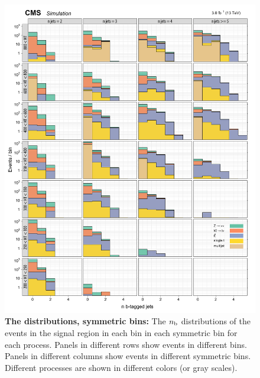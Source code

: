 \begin{figure}[!h]
\centering
\includegraphics[scale=0.95]{figures/kiplots/c150107_s150318_f015_nbjets_100}
\caption{\textbf{\boldmath The \nb distributions, symmetric \njet bins:}
The $n_{\text{b}}$ distributions of the events in the signal region in each
\scalht bin in each symmetric \njet bin for each process. Panels in
different rows show events in different \scalht bins. Panels in
different columns show events in different symmetric \njet bins.
Different processes are shown in different colors (or gray scales).}
\label{c150107_s150318_f015_nbjets_100}
\end{figure}

